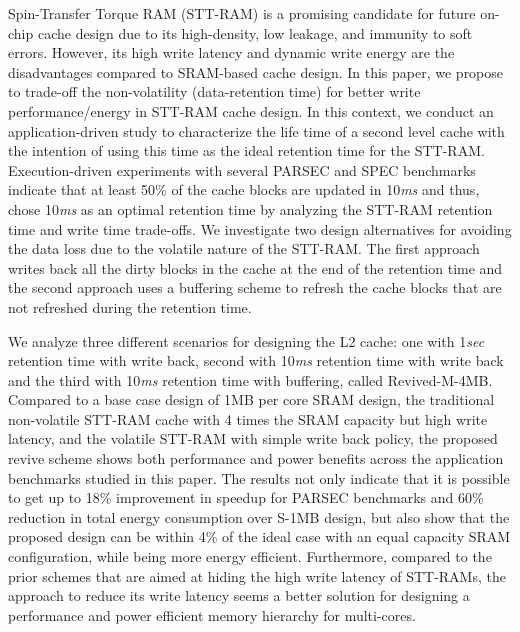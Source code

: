 Spin-Transfer Torque RAM (STT-RAM) is a promising candidate for future
on-chip cache design due to its high-density, low leakage, and immunity to
soft errors.  However, its high write latency and dynamic
write energy are the disadvantages compared to SRAM-based cache design.
In this paper, we propose to trade-off the non-volatility (data-retention time)
for better write performance/energy in STT-RAM cache design.
In this context, we conduct an application-driven study to characterize the
life time of a second level cache with the intention of using this time as the ideal
retention time for the STT-RAM. Execution-driven experiments with several PARSEC and SPEC benchmarks
indicate that at least 50\% of the cache blocks are updated in 10{\it ms} and thus, chose 10{\it ms}
as an optimal retention time by analyzing the STT-RAM retention time and write time trade-offs.
We investigate two design alternatives for avoiding the data loss due to the volatile nature of the
STT-RAM. The first approach writes back all the dirty blocks in the cache at the end of the retention time
and the second approach uses a buffering scheme to refresh the cache blocks that are not refreshed
during the retention time.

We analyze three different scenarios for designing the L2 cache: one with 1{\it sec} retention time with write back,
second with 10{\it ms} retention time with write back and the third with 10{\it ms} retention time with buffering, called
Revived-M-4MB. Compared to a base case design of 1MB per core SRAM design, the traditional non-volatile STT-RAM
cache with 4 times the SRAM capacity but high write latency, and the volatile STT-RAM with simple write back policy,
the proposed revive scheme shows both performance and power benefits across the application benchmarks studied in
this paper. The results not only indicate that it is possible to get up to 18\% improvement in speedup for PARSEC
benchmarks and 60\% reduction in total energy consumption over S-1MB design, but also show that the proposed design can be within 4\% of the ideal case with an equal capacity SRAM configuration, while being more energy efficient.
Furthermore, compared to the prior schemes that are aimed at hiding the high write latency of STT-RAMs,
the approach to reduce its write latency seems a better solution for designing a performance and power efficient
memory hierarchy for multi-cores.

